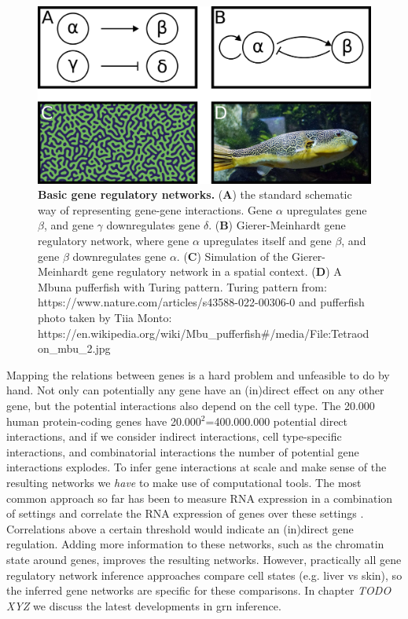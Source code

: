 \begin{figure}[H]
    \center
    \includegraphics[width=0.8\linewidth]{ch.introduction/imgs/network.png}
    \caption{\textbf{Basic gene regulatory networks.} (\textbf{A}) the standard schematic way of representing gene-gene interactions. Gene $\alpha$ upregulates gene $\beta$, and gene $\gamma$ downregulates gene $\delta$. (\textbf{B}) Gierer-Meinhardt gene regulatory network, where gene $\alpha$ upregulates itself and gene $\beta$, and gene $\beta$ downregulates gene $\alpha$. (\textbf{C}) Simulation of the Gierer-Meinhardt gene regulatory network in a spatial context. (\textbf{D}) A Mbuna pufferfish with Turing pattern. Turing pattern from: https://www.nature.com/articles/s43588-022-00306-0 and pufferfish photo taken by Tiia Monto: https://en.wikipedia.org/wiki/Mbu\_pufferfish\#/media/File:Tetraodon\_mbu\_2.jpg}
    \label{fig:network}
\end{figure}

Mapping the relations between genes is a hard problem and unfeasible to do by hand. Not only can potentially any gene have an (in)direct effect on any other gene, but the potential interactions also depend on the cell type. The 20.000 human protein-coding genes have 20.000$^2$=400.000.000 potential direct interactions, and if we consider indirect interactions, cell type-specific interactions, and combinatorial interactions the number of potential gene interactions explodes. To infer gene interactions at scale and make sense of the resulting networks we \textit{have} to make use of computational tools. The most common approach so far has been to measure RNA expression in a combination of settings and correlate the RNA expression of genes over these settings \cite{Zhang_2005,Margolin_2006}. Correlations above a certain threshold would indicate an (in)direct gene regulation. Adding more information to these networks, such as the chromatin state around genes\cite{Xu_2020,Kamal_2021}, improves the resulting networks. However, practically all gene regulatory network inference approaches compare cell states (e.g. liver vs skin), so the inferred gene networks are specific for these comparisons. In chapter \textit{TODO XYZ} we discuss the latest developments in grn inference.

